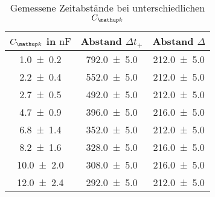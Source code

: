 \begin{table} 
\centering 
\caption{Gemessene Zeitabstände bei unterschiedlichen $C\ua{k}$} 
\label{teilc_gemessene_zeit} 
\begin{tabular}{S S S } 
\toprule  
{$C\ua{k}$ in $\si{\nano\farad}$} & {Abstand $\Delta t_+$} & {Abstand $\Delta $}  \\ 
\midrule  
 \num{1.0\pm0.2} & \num{792.0\pm5.0} & \num{212.0\pm5.0}\\ 
\num{2.2\pm0.4} & \num{552.0\pm5.0} & \num{212.0\pm5.0}\\ 
\num{2.7\pm0.5} & \num{492.0\pm5.0} & \num{212.0\pm5.0}\\ 
\num{4.7\pm0.9} & \num{396.0\pm5.0} & \num{216.0\pm5.0}\\ 
\num{6.8\pm1.4} & \num{352.0\pm5.0} & \num{212.0\pm5.0}\\ 
\num{8.2\pm1.6} & \num{328.0\pm5.0} & \num{216.0\pm5.0}\\ 
\num{10.0\pm2.0} & \num{308.0\pm5.0} & \num{216.0\pm5.0}\\ 
\num{12.0\pm2.4} & \num{292.0\pm5.0} & \num{212.0\pm5.0}\\ 
\bottomrule 
\end{tabular} 
\end{table}
